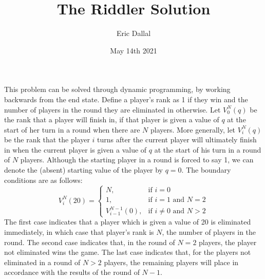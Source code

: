 \documentclass[10pt,a4paper]{article}
\title{The Riddler Solution}
\date{May 14th 2021}
\author{Eric Dallal}
\begin{document}
\maketitle
This problem can be solved through dynamic programming, by working backwards from the end state. Define a player's rank as 1 if they win and the number of players in the round they are eliminated in otherwise. Let $V_{0}^{N}(q)$ be the rank that a player will finish in, if that player is given a value of $q$ at the start of her turn in a round when there are $N$ players. More generally, let $V_{i}^{N}(q)$ be the rank that the player $i$ turns after the current player will ultimately finish in when the current player is given a value of $q$ at the start of his turn in a round of $N$ players. Although the starting player in a round is forced to say 1, we can denote the (absent) starting value of the player by $q = 0$. The boundary conditions are as follows:
\begin{equation}
V_{i}^{N}(20) = \left\{
\begin{array}{ll}
N, & \textrm{if } i = 0\\
1, & \textrm{if } i = 1 \textrm{ and } N = 2\\
V_{i-1}^{N-1}(0), & \textrm{if } i \neq 0 \textrm{ and } N > 2
\end{array}\right.
\end{equation}
The first case indicates that a player which is given a value of 20 is eliminated immediately, in which case that player's rank is $N$, the number of players in the round. The second case indicates that, in the round of $N = 2$ players, the player not eliminated wins the game. The last case indicates that, for the players not eliminated in a round of $N > 2$ players, the remaining players will place in accordance with the results of the round of $N - 1$.
\end{document}
